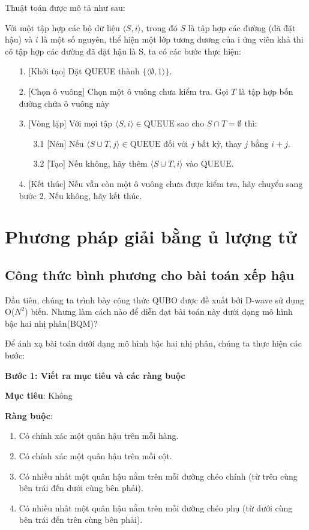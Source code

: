Thuật toán được mô tả như sau:

Với một tập hợp các bộ dữ liệu $\langle S, i\rangle$, trong đó $S$ là tập hợp các đường (đã đặt hậu) và $i$ là một số nguyên, thể hiện một lớp tương đương của i ứng viên khả thi có tập hợp các đường đã đặt hậu là S, ta có các bước thực hiện:
\begin{enumerate}
	\item[1.] [Khởi tạo] Đặt QUEUE thành $\{\langle\emptyset, 1\rangle \}$.
	\item[2.] [Chọn ô vuông] Chọn một ô vuông chưa kiểm tra. Gọi $T$ là tập hợp bốn đường chứa ô vuông này
	\item[3.] [Vòng lặp] Với mọi tập $\langle S, i\rangle \in \text{QUEUE}$ sao cho $S \cap T = \emptyset$ thì:
	\begin{enumerate}
		\item[3.1] [Nén] Nếu $\langle S \cup T, j\rangle \in \text{QUEUE}$ đối với $j$ bất kỳ, thay $j$ bằng $i + j$.
		\item[3.2] [Tạo] Nếu không, hãy thêm $\langle S \cup T, i \rangle$ vào $\text{QUEUE}$.
	\end{enumerate}
	\item[4.] [Kết thúc] Nếu vẫn còn một ô vuông chưa được kiểm tra, hãy chuyển sang bước 2. Nếu không, hãy kết thúc.
\end{enumerate}



\section{Phương pháp giải bằng ủ lượng tử}

\subsection{Công thức bình phương cho bài toán xếp hậu}


Đầu tiên, chúng ta trình bày công thức QUBO được đề xuất bởi D-wave \cite{N Queens Dwave} sử dụng O($N^2$) biến. 
Nhưng làm cách nào để diễn đạt bài toán này dưới dạng mô hình bậc hai nhị phân(BQM)?

Để ánh xạ bài toán dưới dạng mô hình bậc hai nhị phân, chúng ta thực hiện các bước:\cite{Problem Formulation Guide} 


\textbf{Bước 1: Viết ra mục tiêu và các ràng buộc}

\textbf{Mục tiêu}: Không


\textbf{Ràng buộc}:
\begin{enumerate}
	\item Có chính xác một quân hậu trên mỗi hàng.
	\item Có chính xác một quân hậu trên mỗi cột.
	\item Có nhiều nhất một quân hậu nằm trên mỗi đường chéo chính (từ trên cùng bên trái đến dưới cùng bên phải).
	\item Có nhiều nhất một quân hậu nằm trên mỗi đường chéo phụ (từ dưới cùng bên trái đến trên cùng bên phải).
	
\end{enumerate}

